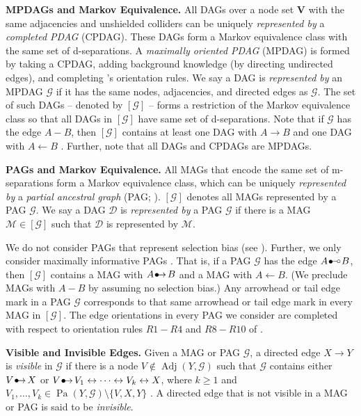 \documentclass[twoside]{article}
\DeclareMathOperator{\Pa}{Pa}
\DeclareMathOperator{\Adj}{Adj}
\newcommand{\mb}[1]{\mathbf{#1}}
\newcommand{\g}[1][G]{\mathcal{#1}}
\newcommand{\bulletcirc}{
  \setlength{\unitlength}{1mm}
  \begin{picture}(5,1)(0,0)
    \put(0.2,0){$\bullet$}
    \put(1.1, 1){\line(1,0){2.4}}
    \put(4, 1){\circle{1}}
  \end{picture}
}
\newcommand{\bulletarrow}{
  \setlength{\unitlength}{1mm}
  \begin{picture}(5,1)(0,0)
    \put(0.2,0){$\bullet$}
    \put(1,0){$\rightarrow$}
  \end{picture}
}
\begin{document}
\textbf{MPDAGs and Markov Equivalence.}
All DAGs over a node set $\mb{V}$ with the same adjacencies and unshielded colliders can be uniquely \textit{represented by} a \textit{completed PDAG} (CPDAG). These DAGs form a Markov equivalence class with the same set of d-separations. A \textit{maximally oriented PDAG} (MPDAG) is formed by taking a CPDAG, adding background knowledge (by directing undirected edges), and completing \cite{meek1995causal}'s orientation rules. We say a DAG is \textit{represented by} an MPDAG $\g$ if it has the same nodes, adjacencies, and directed edges as $\g$. The set of such DAGs -- denoted by $[\g]$ -- forms a restriction of the Markov equivalence class so that all DAGs in $[\g]$ have same set of d-separations. Note that if $\g$ has the edge $A - B$, then $[\g]$ contains at least one DAG with $A \to B$ and one DAG with $A \leftarrow B$ \citep{meek1995causal}. Further, note that all DAGs and CPDAGs are MPDAGs.

\textbf{PAGs and Markov Equivalence.}
All MAGs that encode the same set of m-separations form a Markov equivalence class, which can be uniquely \textit{represented by} a \textit{partial ancestral graph} (PAG; \citealp{richardson2002ancestral, ali2009markov}). $[\g]$ denotes all MAGs represented by a PAG $\g$. We say a DAG $\g[D]$ is \textit{represented by} a PAG $\g$ if there is a MAG $\g[M] \in [\g]$ such that $\g[D]$ is represented by $\g[M]$.

We do not consider PAGs that represent selection bias (see \citealp{zhang2008completeness}). Further, we only consider maximally informative PAGs \citep{zhang2008completeness}. That is, if a PAG $\g$ has the edge $A \bulletcirc B$, then $[\g]$ contains a MAG with $A \bulletarrow B$ and a MAG with $A \gets B$. (We preclude MAGs with $A - B$ by assuming no selection bias.) Any arrowhead or tail edge mark in a PAG $\g$ corresponds to that same arrowhead or tail edge mark in every MAG in $[\g]$. The edge orientations in every PAG we consider are completed with respect to orientation rules $R1-R4$ and $R8-R10$ of \cite{zhang2008completeness}.

\textbf{Visible and Invisible Edges.}
Given a MAG or PAG $\g$, a directed edge $X \rightarrow Y$ is \textit{visible} in $\g$ if there is a node $V \notin \Adj(Y, \g)$ such that $\g$ contains either $V \bulletarrow X$ or $V \bulletarrow V_1 \leftrightarrow \dots \leftrightarrow V_k \leftrightarrow X$, where $k \ge 1$ and $V_1, \dots, V_k \in \Pa(Y, \g) \setminus \{V,X,Y\}$ \citep{zhang2006causal}. A directed edge that is not visible in a MAG or PAG is said to be \textit{invisible}. 
\end{document}
